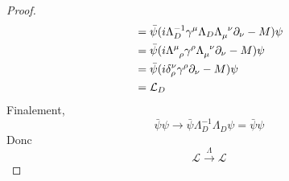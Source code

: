 \documentclass{article}
\numberwithin{equation}{section}
\theoremstyle{solution}
\begin{document}
\begin{proof}
\begin{align*}
                 &= \bar{\psi}(i \Lambda_D^{-1}\gamma^{\mu} \Lambda_D \Lambda\indices{_{\mu}^{\nu}}\partial_\nu - M)\psi \\
                 &= \bar{\psi}(i \Lambda\indices{^{\mu}_{\rho}}\gamma^{\rho}\Lambda\indices{_{\mu}^{\nu}}\partial_\nu - M)\psi \\
                 &= \bar{\psi}(i \delta^{\nu}_\rho\gamma^{\rho}\partial_\nu - M)\psi \\
                 &= \mathcal{L}_D
\end{align*}
Finalement,
\begin{equation}
        \bar{\psi}\psi \rightarrow \bar{\psi}\Lambda_D^{-1}\Lambda_D \psi = \bar{\psi} \psi
\end{equation} 
Donc
\begin{equation}
        \mathcal{L} \overset{\Lambda}{\rightarrow} \mathcal{L} 
\end{equation} 
\end{proof}
\end{document}
